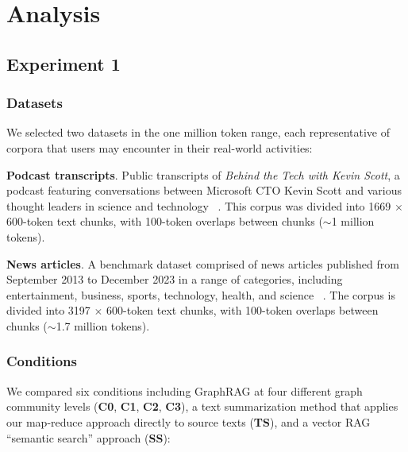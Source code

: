 \documentclass{article}
\begin{document}
\section{Analysis}
\label{sec:eval}

\subsection{Experiment 1}
\subsubsection{Datasets}

We selected two datasets in the one million token range, each representative of corpora that users may encounter in their real-world activities:

\textbf{Podcast transcripts}. Public transcripts of \emph{Behind the Tech with Kevin Scott}, a podcast featuring conversations between Microsoft CTO Kevin Scott and various thought leaders in science and technology ~\citep{BehindTheTech}.
This corpus was divided into 1669 $\times$ 600-token text chunks, with 100-token overlaps between chunks ($\sim$1 million tokens).

\textbf{News articles}. A benchmark dataset comprised of news articles published from September 2013 to December 2023 in a range of categories, including entertainment, business, sports, technology, health, and science ~\citep{tang2024multihop}.
The corpus is divided into 3197 $\times$ 600-token text chunks, with 100-token overlaps between chunks ($\sim$1.7 million tokens).

\subsubsection{Conditions}

We compared six conditions including GraphRAG at four different graph community levels (\textbf{C0}, \textbf{C1}, \textbf{C2}, \textbf{C3}), a text summarization method that applies our map-reduce approach directly to source texts (\textbf{TS}), and a vector RAG ``semantic search'' approach (\textbf{SS}):
\end{document}
